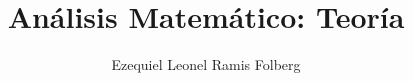 

\usepackage{tabularx}


    \title{Análisis Matemático: Teoría}
    \author{Ezequiel Leonel Ramis Folberg}
    \maketitle
    \tableofcontents
    \newpage
    \setcounter{section}{-1}
    
    
